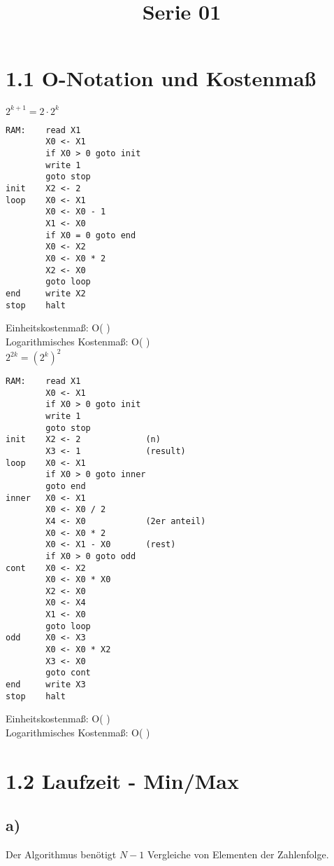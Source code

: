 
\title{Serie 01}


\section*{1.1 O-Notation und Kostenmaß}

\textbf{$2^{k+1} = 2 \cdot 2^k$}

\begin{lstlisting}
RAM:    read X1
        X0 <- X1
        if X0 > 0 goto init
        write 1
        goto stop
init    X2 <- 2
loop    X0 <- X1
        X0 <- X0 - 1
        X1 <- X0
        if X0 = 0 goto end
        X0 <- X2
        X0 <- X0 * 2
        X2 <- X0
        goto loop
end     write X2
stop    halt    
\end{lstlisting}
\noindent
Einheitskostenmaß: O( ) \\
Logarithmisches Kostenmaß: O( )\\

\noindent
\textbf{$2^{2k} = (2^k)^2$}
\begin{lstlisting}
RAM:    read X1
        X0 <- X1
        if X0 > 0 goto init
        write 1
        goto stop
init    X2 <- 2             (n)
        X3 <- 1             (result)
loop    X0 <- X1
        if X0 > 0 goto inner
        goto end
inner   X0 <- X1
        X0 <- X0 / 2        
        X4 <- X0            (2er anteil)
        X0 <- X0 * 2
        X0 <- X1 - X0       (rest)
        if X0 > 0 goto odd
cont    X0 <- X2
        X0 <- X0 * X0
        X2 <- X0
        X0 <- X4
        X1 <- X0
        goto loop
odd     X0 <- X3
        X0 <- X0 * X2
        X3 <- X0
        goto cont
end     write X3
stop    halt    
\end{lstlisting}

\noindent
Einheitskostenmaß: O( ) \\
Logarithmisches Kostenmaß: O( )\\

\section*{1.2 Laufzeit - Min/Max}
\subsection*{a)}
Der Algorithmus benötigt $N - 1$ Vergleiche von Elementen der Zahlenfolge.
